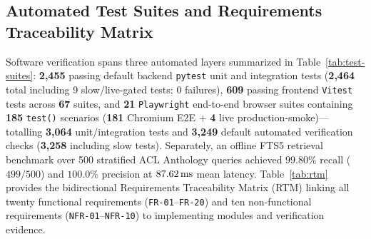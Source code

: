\subsection{Automated Test Suites and Requirements Traceability Matrix}

Software verification spans three automated layers summarized in Table~\ref{tab:test-suites}: \textbf{2,455} passing default backend \texttt{pytest} unit and integration tests (\textbf{2,464} total including 9 slow/live-gated tests; 0 failures), \textbf{609} passing frontend \texttt{Vitest} tests across \textbf{67} suites, and \textbf{21} \texttt{Playwright} end-to-end browser suites containing \textbf{185} \texttt{test()} scenarios (\textbf{181} Chromium E2E + \textbf{4} live production-smoke)---totalling \textbf{3,064} unit/integration tests and \textbf{3,249} default automated verification checks (\textbf{3,258} including slow tests). Separately, an offline FTS5 retrieval benchmark over 500 stratified ACL Anthology queries achieved $99.80\%$ recall ($499/500$) and $100.0\%$ precision at $87.62\text{\,ms}$ mean latency. Table~\ref{tab:rtm} provides the bidirectional Requirements Traceability Matrix (RTM) linking all twenty functional requirements (\texttt{FR-01}--\texttt{FR-20}) and ten non-functional requirements (\texttt{NFR-01}--\texttt{NFR-10}) to implementing modules and verification evidence.


